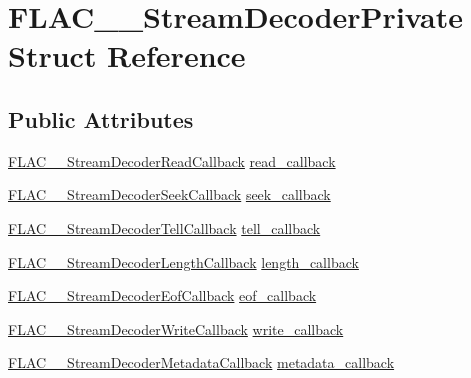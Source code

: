 \hypertarget{struct_f_l_a_c_____stream_decoder_private}{}\section{F\+L\+A\+C\+\_\+\+\_\+\+Stream\+Decoder\+Private Struct Reference}
\label{struct_f_l_a_c_____stream_decoder_private}
\subsection*{Public Attributes}
\begin{DoxyCompactItemize}
\item 
\hyperlink{group__flac__stream__decoder_ga25d4321dc2f122d35ddc9061f44beae7}{F\+L\+A\+C\+\_\+\+\_\+\+Stream\+Decoder\+Read\+Callback} \hyperlink{struct_f_l_a_c_____stream_decoder_private_a12d4e991ec3552411f9cdd6e5f6819b0}{read\+\_\+callback}
\item 
\hyperlink{group__flac__stream__decoder_ga4c18b0216e0f7a83d7e4e7001230545d}{F\+L\+A\+C\+\_\+\+\_\+\+Stream\+Decoder\+Seek\+Callback} \hyperlink{struct_f_l_a_c_____stream_decoder_private_a429d6bc148bf07e43f4ab74b49902759}{seek\+\_\+callback}
\item 
\hyperlink{group__flac__stream__decoder_gafdf1852486617a40c285c0d76d451a5a}{F\+L\+A\+C\+\_\+\+\_\+\+Stream\+Decoder\+Tell\+Callback} \hyperlink{struct_f_l_a_c_____stream_decoder_private_aebf1aab0a42785420daa2161e46617f7}{tell\+\_\+callback}
\item 
\hyperlink{group__flac__stream__decoder_ga5363f3b46e3f7d6a73385f6560f7e7ef}{F\+L\+A\+C\+\_\+\+\_\+\+Stream\+Decoder\+Length\+Callback} \hyperlink{struct_f_l_a_c_____stream_decoder_private_afaaf5d22df69bb83eaff5e9e579adcc5}{length\+\_\+callback}
\item 
\hyperlink{group__flac__stream__decoder_ga4eac094fc609363532d90cf8374b4f7e}{F\+L\+A\+C\+\_\+\+\_\+\+Stream\+Decoder\+Eof\+Callback} \hyperlink{struct_f_l_a_c_____stream_decoder_private_a41a4cf61c44ca9c59f5f3e3ca6d046bc}{eof\+\_\+callback}
\item 
\hyperlink{group__flac__stream__decoder_ga61e48dc2c0d2f6c5519290ff046874a4}{F\+L\+A\+C\+\_\+\+\_\+\+Stream\+Decoder\+Write\+Callback} \hyperlink{struct_f_l_a_c_____stream_decoder_private_ae2c2b48a59583f6b5ebcc86fac9066c6}{write\+\_\+callback}
\item 
\hyperlink{group__flac__stream__decoder_ga6aa87c01744c1c601b7f371f627b6e14}{F\+L\+A\+C\+\_\+\+\_\+\+Stream\+Decoder\+Metadata\+Callback} \hyperlink{struct_f_l_a_c_____stream_decoder_private_a45879877f15a96ec5d05df4a8893ed96}{metadata\+\_\+callback}

\end{DoxyCompactItemize}
